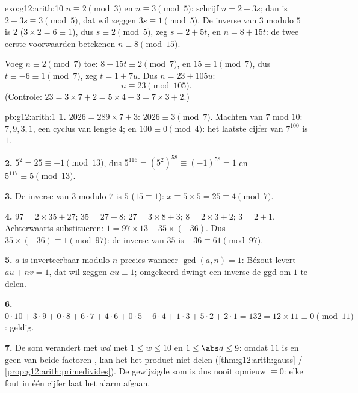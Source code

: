 \begin{solution}{exo:g12:arith:10}
$n \equiv 2 \pmod 3$ en $n \equiv 3 \pmod 5$: schrijf $n = 2 + 3s$; dan is
$2 + 3s \equiv 3 \pmod 5$, dat wil zeggen $3s \equiv 1 \pmod 5$. De inverse
van $3$ modulo $5$ is $2$ ($3\times2 = 6 \equiv 1$), dus $s \equiv 2 \pmod 5$,
zeg $s = 2 + 5t$, en $n = 8 + 15t$: de twee eerste voorwaarden betekenen
$n \equiv 8 \pmod{15}$.

Voeg $n \equiv 2 \pmod 7$ toe: $8 + 15t \equiv 2 \pmod 7$, en
$15 \equiv 1 \pmod 7$, dus $t \equiv -6 \equiv 1 \pmod 7$, zeg
$t = 1 + 7u$. Dus $n = 23 + 105u$:
\[
n \equiv 23 \pmod{105}.
\]
(Controle: $23 = 3\times7 + 2 = 5\times4 + 3 = 7\times3 + 2$.)
\end{solution}

\begin{solution}{pb:g12:arith:1}
\textbf{1.} $2026 = 289 \times 7 + 3$: $2026 \equiv 3 \pmod 7$. Machten van
$7$ mod $10$: $7, 9, 3, 1$, een cyclus van lengte $4$; en
$100 \equiv 0 \pmod 4$: het laatste cijfer van $7^{100}$ is $1$.

\textbf{2.} $5^2 = 25 \equiv -1 \pmod{13}$, dus
$5^{116} = \left(5^2\right)^{58} \equiv (-1)^{58} = 1$ en
$5^{117} \equiv 5 \pmod{13}$.

\textbf{3.} De inverse van $3$ modulo $7$ is $5$ ($15 \equiv 1$):
$x \equiv 5 \times 5 = 25 \equiv 4 \pmod 7$.

\textbf{4.} $97 = 2 \times 35 + 27$; $35 = 27 + 8$; $27 = 3 \times 8 + 3$;
$8 = 2 \times 3 + 2$; $3 = 2 + 1$. Achterwaarts substitueren:
$1 = 97 \times 13 + 35 \times (-36)$. Dus $35 \times (-36) \equiv 1
\pmod{97}$: de inverse van $35$ is $-36 \equiv 61 \pmod{97}$.

\textbf{5.} $a$ is inverteerbaar modulo $n$ precies wanneer
$\gcd(a, n) = 1$: Bézout levert $au + nv = 1$, dat wil zeggen
$au \equiv 1$; omgekeerd dwingt een inverse de ggd om $1$ te delen.

\textbf{6.} $0{\cdot}10 + 3{\cdot}9 + 0{\cdot}8 + 6{\cdot}7 +
4{\cdot}6 + 0{\cdot}5 + 6{\cdot}4 + 1{\cdot}3 + 5{\cdot}2 +
2{\cdot}1 = 132 = 12 \times 11 \equiv 0 \pmod{11}$: geldig.

\textbf{7.} De som verandert met $wd$ met $1 \leq w \leq 10$ en
$1 \leq \abs d \leq 9$: omdat $11$  is en geen van beide factoren ,
kan het het product niet delen
(\cref{thm:g12:arith:gauss} / \cref{prop:g12:arith:primedivides}). De
gewijzigde som is dus nooit opnieuw $\equiv 0$: elke fout in één cijfer laat
het alarm afgaan.


\end{solution}
